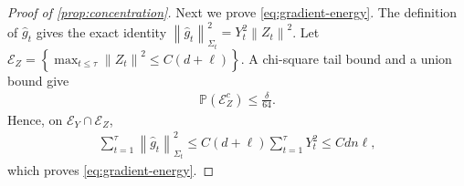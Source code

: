\documentclass[11pt]{article}
\newcommand{\Pp}{\mathbb P}
\newcommand{\1}{\mathbf 1}
\newcommand{\norm}[1]{\left\lVert #1\right\rVert}
\newcommand{\normm}[2]{\left\lVert #1\right\rVert_{#2}}
\begin{document}
\begin{proof}[Proof of \cref{prop:concentration}]
    Next we prove \eqref{eq:gradient-energy}.
    The definition of $\widehat g_t$ gives the exact identity
    $\normm{\widehat g_t}{\Sigma_t}^2=Y_t^2\norm{Z_t}^2$.
    Let
    $\mathcal E_Z
        =\left\{
        \max_{t\leq\tau}\norm{Z_t}^2\leq C(d+\ell)
        \right\}$.
    A chi-square tail bound and a union bound give
    \begin{align}
        \Pp(\mathcal E_Z^c)\leq\frac{\delta}{64}.
        \label{eq:Z-norm-union}
    \end{align}
    Hence, on $\mathcal E_Y\cap\mathcal E_Z$,
    \begin{align}
        \sum_{t=1}^{\tau}
        \normm{\widehat g_t}{\Sigma_t}^2
        \leq
        C(d+\ell)\sum_{t=1}^{\tau}Y_t^2
        \leq Cdn\ell,
    \end{align}
    which proves \eqref{eq:gradient-energy}.


\end{proof}
\end{document}
